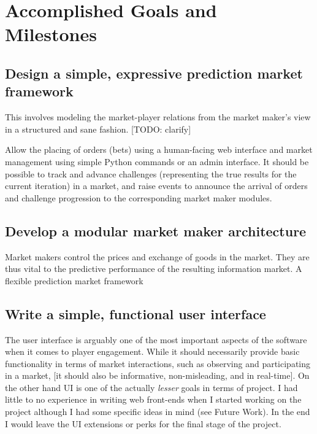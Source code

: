 \documentclass[bsc,frontabs,twoside,singlespacing,parskip,deptreport]{infthesis}     %
\begin{document}
\section{Accomplished Goals and Milestones}    

\subsection{Design a simple, expressive prediction market framework}
    This involves modeling the market-player relations from the market maker’s view in a structured and sane fashion. [TODO: clarify]

Allow the placing of orders (bets) using a human-facing web interface and market management using simple Python commands or an admin interface. It should be possible to track and advance challenges (representing the true results for the current iteration) in a market, and raise events to announce the arrival of orders and challenge progression to the corresponding market maker modules. 

\subsection{Develop a modular market maker architecture}

Market makers control the prices and exchange of goods in the market. They are thus vital to the predictive performance of the resulting information market. A flexible prediction market framework 




\subsection{Write a simple, functional user interface}
    The user interface is arguably one of the most important aspects of the software when it comes to player engagement. While it should necessarily provide basic functionality in terms of market interactions, such as observing and participating in a market, [it should also be informative, non-misleading, and in real-time]. 
On the other hand UI is one of the actually {\em lesser} goals in terms of project. I had little to no experience in writing web front-ends when I started working on the project although I had some specific ideas in mind (see Future Work). In the end I would leave the UI extensions or perks for the final stage of the project. 
    
\end{document}

